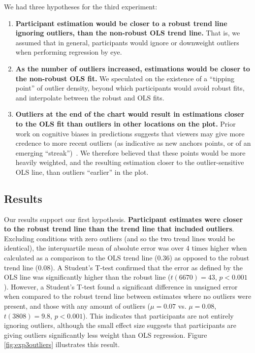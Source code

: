 \documentclass{sigchi}
\begin{document}
We had three hypotheses for the third experiment:
\begin{enumerate}
	\item \textbf{Participant estimation would be closer to a robust trend line ignoring outliers, than the non-robust OLS trend line.} That is, we assumed that in general, participants would ignore or downweight outliers when performing regression by eye.
	\item \textbf{As the number of outliers increased, estimations would be closer to the non-robust OLS fit.} We speculated on the existence of a ``tipping point'' of outlier density, beyond which participants would avoid robust fits, and interpolate between the robust and OLS fits.
	\item \textbf{Outliers at the end of the chart would result in estimations closer to the OLS fit than outliers in other locations on the plot.} Prior work on cognitive biases in predictions suggests that viewers may give more credence to more recent outliers (as indicative as new anchors points, or of an emerging ``streak'')~\cite{croson2005gambler}. We therefore believed that these points would be more heavily weighted, and the resulting estimation closer to the outlier-sensitive OLS line, than outliers ``earlier'' in the plot.
\end{enumerate}

\subsection{Results}

\expThreeOutliersFig

Our results support our first hypothesis. \textbf{Participant estimates were closer to the robust trend line than the trend line that included outliers}. Excluding conditions with zero outliers (and so the two trend lines would be identical), the interquartile mean of absolute error was over $4$ times higher when calculated as a comparison to the OLS trend line ($0.36$) as opposed to the robust trend line ($0.08$). A Student's T-test confirmed that the error as defined by the OLS line was significantly higher than the robust line ($t(6670)= 43$, $p<0.001$). However, a Student's T-test found a significant difference in unsigned error when compared to the robust trend line between estimates where no outliers were present, and those with any amount of outliers ($\mu=0.07$ vs. $\mu=0.08$, $t(3808) = 9.8$, $p<0.001$). This indicates that participants are not entirely ignoring outliers, although the small effect size suggests that participants are giving outliers significantly less weight than OLS regression. Figure \ref{fig:exp3outliers} illustrates this result.
\end{document}
